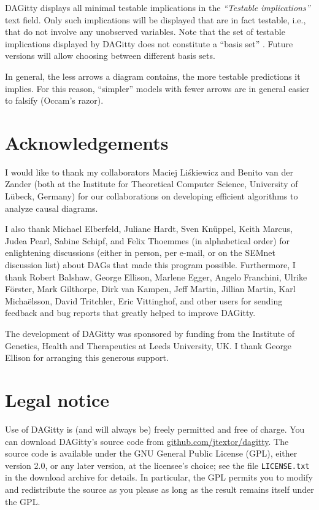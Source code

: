\documentclass[a4paper]{article} %
\newcommand{\pp}{DAGitty\xspace}
\newcommand{\action}[1]{\emph{``#1''}}
\begin{document}
\pp displays all minimal testable implications 
in the \action{Testable implications} text field. Only such
implications will be displayed that are in fact testable,
i.e., that do not involve any unobserved variables. Note
that the set of testable implications displayed by \pp
does not constitute a ``basis set'' \cite{Pearl2009}. 
Future versions will allow choosing between different basis sets. 

In general, the less arrows a diagram contains, the more testable
predictions it implies. For this reason, ``simpler'' models with
fewer arrows are in general easier to falsify (Occam's razor).


\section{Acknowledgements}

I would like to thank my collaborators Maciej Li\'skiewicz
and Benito van der Zander (both at the Institute for Theoretical Computer Science,
University of L\"ubeck, Germany) for our collaborations on developing efficient algorithms
to analyze causal diagrams.  

I also thank Michael Elberfeld, Juliane Hardt, 
Sven Kn\"{u}ppel, Keith Marcus, Judea Pearl, Sabine Schipf, 
and Felix Thoemmes (in alphabetical order) for enlightening discussions
(either in person, per e-mail, or on the SEMnet discussion list)
about DAGs that made this program possible. Furthermore, I thank
Robert Balshaw, George Ellison, 
Marlene Egger, Angelo Franchini,  Ulrike F\"{o}rster, Mark Gilthorpe, 
Dirk van Kampen,
Jeff Martin, Jillian Martin, Karl Micha\"{e}lsson,
David Tritchler, Eric Vittinghof, 
and other users for sending feedback and bug reports that greatly
helped to improve \pp. 

The development of DAGitty was sponsored by funding from the 
Institute of Genetics, Health and Therapeutics at Leeds
University, UK. I thank George Ellison for arranging this
generous support.

\section{Legal notice}

Use of \pp is (and will always be) freely permitted and free of charge. 
You can download \pp's source code from \url{github.com/jtextor/dagitty}.
The source code is available under the GNU General Public License (GPL),
either version 2.0, or any later version, at the licensee's choice;
see the file \verb|LICENSE.txt| in the download archive for details.
In particular, the GPL permits you to  modify and redistribute the source
as you please as long as the result remains itself under the GPL.
\end{document}
